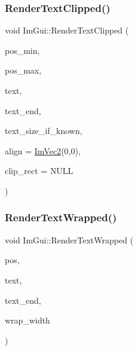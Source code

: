 \subsubsection{\texorpdfstring{Render\+Text\+Clipped()}{RenderTextClipped()}}
{\footnotesize\ttfamily void Im\+Gui\+::\+Render\+Text\+Clipped (\begin{DoxyParamCaption}\item[{const \hyperlink{struct_im_vec2}{Im\+Vec2} \&}]{pos\+\_\+min,  }\item[{const \hyperlink{struct_im_vec2}{Im\+Vec2} \&}]{pos\+\_\+max,  }\item[{const char $\ast$}]{text,  }\item[{const char $\ast$}]{text\+\_\+end,  }\item[{const \hyperlink{struct_im_vec2}{Im\+Vec2} $\ast$}]{text\+\_\+size\+\_\+if\+\_\+known,  }\item[{const \hyperlink{struct_im_vec2}{Im\+Vec2} \&}]{align = {\ttfamily \hyperlink{struct_im_vec2}{Im\+Vec2}(0,0)},  }\item[{const \hyperlink{struct_im_rect}{Im\+Rect} $\ast$}]{clip\+\_\+rect = {\ttfamily NULL} }\end{DoxyParamCaption})}

\hypertarget{namespace_im_gui_aa483b40f6899e1b289b4bf6c2673d1d2}{}\label{namespace_im_gui_aa483b40f6899e1b289b4bf6c2673d1d2} 
\subsubsection{\texorpdfstring{Render\+Text\+Wrapped()}{RenderTextWrapped()}}
{\footnotesize\ttfamily void Im\+Gui\+::\+Render\+Text\+Wrapped (\begin{DoxyParamCaption}\item[{\hyperlink{struct_im_vec2}{Im\+Vec2}}]{pos,  }\item[{const char $\ast$}]{text,  }\item[{const char $\ast$}]{text\+\_\+end,  }\item[{float}]{wrap\+\_\+width }\end{DoxyParamCaption})}

\hypertarget{namespace_im_gui_ad11a82904a65722d285230567af826b8}{}\label{namespace_im_gui_ad11a82904a65722d285230567af826b8} 
